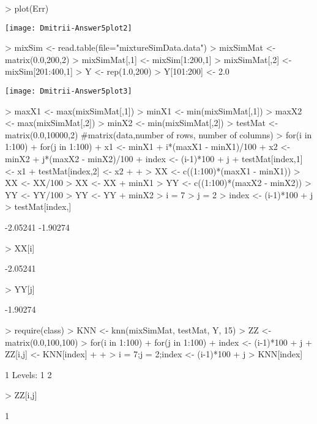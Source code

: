 \documentclass{article}
\begin{document}
\begin{Schunk}
\begin{Sinput}
> plot(Err)
\end{Sinput}
\end{Schunk}
\texttt{[image: Dmitrii-Answer5plot2]}
\begin{Schunk}
\begin{Sinput}
> mixSim <- read.table(file="mixtureSimData.data")
> mixSimMat <- matrix(0.0,200,2)
> mixSimMat[,1] <- mixSim[1:200,1]
> mixSimMat[,2] <- mixSim[201:400,1]
> Y <- rep(1.0,200)  
> Y[101:200] <- 2.0
\end{Sinput}
\end{Schunk}
\begin{Schunk}
\end{Schunk}
\texttt{[image: Dmitrii-Answer5plot3]}
\begin{Schunk}
\begin{Sinput}
> maxX1 <- max(mixSimMat[,1])
> minX1 <- min(mixSimMat[,1])
> maxX2 <- max(mixSimMat[,2])
> minX2 <- min(mixSimMat[,2])
> testMat <- matrix(0.0,10000,2) #matrix(data,number of rows, number of columns)
> for(i in 1:100){
+   for(j in 1:100){
+     x1 <- minX1 + i*(maxX1 - minX1)/100
+     x2 <- minX2 + j*(maxX2 - minX2)/100
+     index <- (i-1)*100 + j
+     testMat[index,1] <- x1
+     testMat[index,2] <- x2
+   }    
+ }
> XX <- c((1:100)*(maxX1 - minX1))
> XX <- XX/100
> XX <- XX + minX1
> YY <- c((1:100)*(maxX2 - minX2))
> YY <- YY/100
> YY <- YY + minX2
> i = 7
> j = 2
> index <- (i-1)*100 + j
> testMat[index,]
\end{Sinput}
\begin{Soutput}
[1] -2.05241 -1.90274
\end{Soutput}
\begin{Sinput}
> XX[i]
\end{Sinput}
\begin{Soutput}
[1] -2.05241
\end{Soutput}
\begin{Sinput}
> YY[j]
\end{Sinput}
\begin{Soutput}
[1] -1.90274
\end{Soutput}
\begin{Sinput}
> require(class)
> KNN <- knn(mixSimMat, testMat, Y, 15)  
> ZZ <- matrix(0.0,100,100)
> for(i in 1:100){
+   for(j in 1:100){
+     index <- (i-1)*100 + j
+     ZZ[i,j] <- KNN[index]
+   }
+ }
> i = 7;j = 2;index <- (i-1)*100 + j
> KNN[index] 
\end{Sinput}
\begin{Soutput}
[1] 1
Levels: 1 2
\end{Soutput}
\begin{Sinput}
> ZZ[i,j]    
\end{Sinput}
\begin{Soutput}
[1] 1
\end{Soutput}
\end{Schunk}
\end{document}
